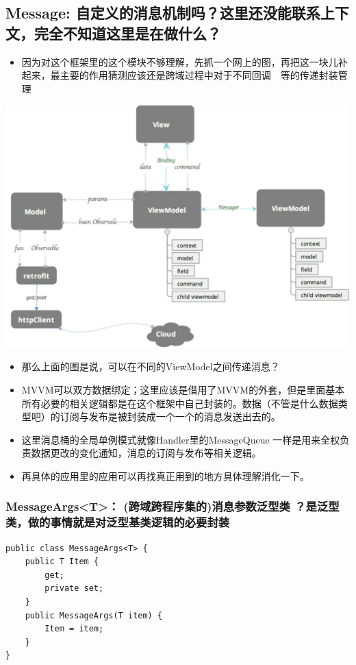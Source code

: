 \documentclass[9pt, b5paper]{article}
\begin{document}
\subsection{Message: 自定义的消息机制吗？这里还没能联系上下文，完全不知道这里是在做什么？}
\label{sec-6-2}
\begin{itemize}
\item 因为对这个框架里的这个模块不够理解，先抓一个网上的图，再把这一块儿补起来，最主要的作用猜测应该还是跨域过程中对于不同回调　等的传递封装管理
\end{itemize}

\includegraphics[width=.9\linewidth]{./pic/readme_unity_20220929_135756.png}
\begin{itemize}
\item 那么上面的图是说，可以在不同的ViewModel之间传递消息？
\item MVVM可以双方数据绑定；这里应该是借用了MVVM的外套，但是里面基本所有必要的相关逻辑都是在这个框架中自己封装的。数据（不管是什么数据类型吧）的订阅与发布是被封装成一个一个的消息发送出去的。
\item 这里消息桶的全局单例模式就像Handler里的MessageQueue 一样是用来全权负责数据更改的变化通知，消息的订阅与发布等相关逻辑。
\item 再具体的应用里的应用可以再找真正用到的地方具体理解消化一下。　
\end{itemize}
\subsubsection{MessageArgs<T>： (跨域跨程序集的)消息参数泛型类 ？是泛型类，做的事情就是对泛型基类逻辑的必要封装}
\label{sec-6-2-1}
\begin{verbatim}
public class MessageArgs<T> {
    public T Item {
        get;
        private set;
    }
    public MessageArgs(T item) {
        Item = item;
    }
}
\end{verbatim}
\end{document}
